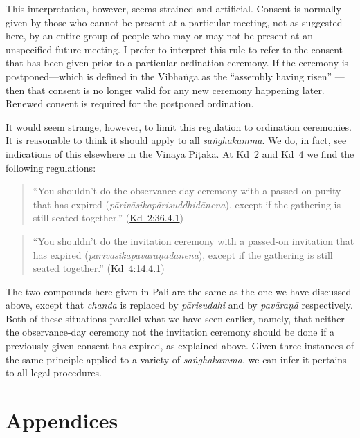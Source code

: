\documentclass[12pt,openany]{book}%
\begin{document}
This interpretation, however, seems strained and artificial. Consent is normally given by those who cannot be present at a particular meeting, not as suggested here, by an entire group of people who may or may not be present at an unspecified future meeting. I prefer to interpret this rule to refer to the consent that has been given prior to a particular ordination ceremony. If the ceremony is postponed—which is defined in the \textsanskrit{Vibhaṅga} as the “assembly having risen” —then that consent is no longer valid for any new ceremony happening later. Renewed consent is required for the postponed ordination.

It would seem strange, however, to limit this regulation to ordination ceremonies. It is reasonable to think it should apply to all \textit{\textsanskrit{saṅghakamma}}. We do, in fact, see indications of this elsewhere in the Vinaya \textsanskrit{Piṭaka}. At Kd 2 and Kd 4 we find the following regulations:

\begin{quotation}%
“You shouldn’t do the observance-day ceremony with a passed-on purity that has expired (\textit{\textsanskrit{pārivāsikapārisuddhidānena}}), except if the gathering is still seated together.” (\href{https://suttacentral.net/pli-tv-kd2/en/brahmali\#36.4.1}{Kd~2:36.4.1})

%
\end{quotation}

\begin{quotation}%
“You shouldn’t do the invitation ceremony with a passed-on invitation that has expired (\textit{\textsanskrit{pārivāsikapavāraṇādānena}}), except if the gathering is still seated together.” (\href{https://suttacentral.net/pli-tv-kd4/en/brahmali\#14.4.1}{Kd~4:14.4.1})

%
\end{quotation}

The two compounds here given in Pali are the same as the one we have discussed above, except that \textit{chanda} is replaced by \textit{\textsanskrit{pārisuddhi}} and by \textit{\textsanskrit{pavāraṇā}} respectively. Both of these situations parallel what we have seen earlier, namely, that neither the observance-day ceremony not the invitation ceremony should be done if a previously given consent has expired, as explained above. Given three instances of the same principle applied to a variety of \textit{\textsanskrit{saṅghakamma}}, we can infer it pertains to all legal procedures.

%
\chapter*{Appendices}
\end{document}
